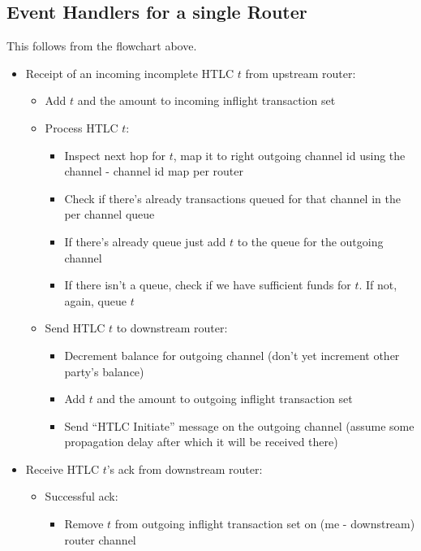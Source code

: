 \documentclass[a4paper]{article}
\begin{document}
\subsection{Event Handlers for a single Router}
This follows from the flowchart above. 
\begin{itemize}
    \item Receipt of an incoming incomplete HTLC $t$ from upstream router: 
        \begin{itemize}
            \item Add $t$ and the amount to incoming inflight transaction set
             \item Process HTLC $t$:
                \begin{itemize}
                    \item Inspect next hop for $t$, map it to right outgoing channel id using the channel - channel id map per router
                    \item Check if there's already transactions queued for that channel in the per channel queue
                    \item If there's already queue just add $t$ to the queue for the outgoing channel
                    \item If there isn't a queue, check if we have sufficient funds for $t$. If not, again, queue $t$
                \end{itemize}
            \item Send HTLC $t$ to downstream router:
                \begin{itemize}
                    \item Decrement balance for outgoing channel (don't yet increment other party's balance)
                    \item Add $t$ and the amount to outgoing inflight transaction set
                    \item Send ``HTLC Initiate'' message on the outgoing channel (assume some propagation delay after which it will be received there)
                \end{itemize}
        \end{itemize}
    \item Receive HTLC $t$'s ack from downstream router:
        \begin{itemize}
            \item Successful ack:
                \begin{itemize}
                    \item Remove $t$ from outgoing inflight transaction set on (me - downstream) router channel

\end{itemize}
\end{itemize}
\end{itemize}
\end{document}
